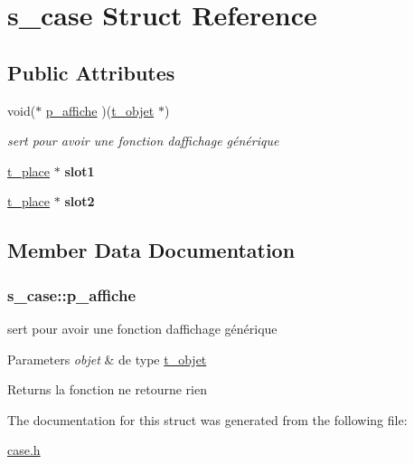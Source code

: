 \hypertarget{structs__case}{}\section{s\+\_\+case Struct Reference}
\label{structs__case}
\subsection*{Public Attributes}
\begin{DoxyCompactItemize}
\item 
void($\ast$ \hyperlink{structs__case_ab72efb72d5e1031d46e96c61c9c2e123}{p\+\_\+affiche} )(\hyperlink{structt__objet}{t\+\_\+objet} $\ast$)
\begin{DoxyCompactList}\small\item\em sert pour avoir une fonction d\textquotesingle{}affichage générique \end{DoxyCompactList}\item 
\hyperlink{structs__place}{t\+\_\+place} $\ast$ {\bfseries slot1}\hypertarget{structs__case_a88358de79f1bfb51549cd344a28fcff6}{}\label{structs__case_a88358de79f1bfb51549cd344a28fcff6}

\item 
\hyperlink{structs__place}{t\+\_\+place} $\ast$ {\bfseries slot2}\hypertarget{structs__case_a101455287fd931e3a5f0ff3ffade4cfc}{}\label{structs__case_a101455287fd931e3a5f0ff3ffade4cfc}

\end{DoxyCompactItemize}


\subsection{Member Data Documentation}
\subsubsection[{\texorpdfstring{p\+\_\+affiche}{p_affiche}}]{\setlength{\rightskip}{0pt plus 5cm}s\+\_\+case\+::p\+\_\+affiche}\hypertarget{structs__case_ab72efb72d5e1031d46e96c61c9c2e123}{}\label{structs__case_ab72efb72d5e1031d46e96c61c9c2e123}


sert pour avoir une fonction d\textquotesingle{}affichage générique 


\begin{DoxyParams}{Parameters}
{\em objet} & de type \hyperlink{structt__objet}{t\+\_\+objet} \\
\hline
\end{DoxyParams}
\begin{DoxyReturn}{Returns}
la fonction ne retourne rien 
\end{DoxyReturn}


The documentation for this struct was generated from the following file\+:\begin{DoxyCompactItemize}
\item 
\hyperlink{case_8h}{case.\+h}\end{DoxyCompactItemize}

